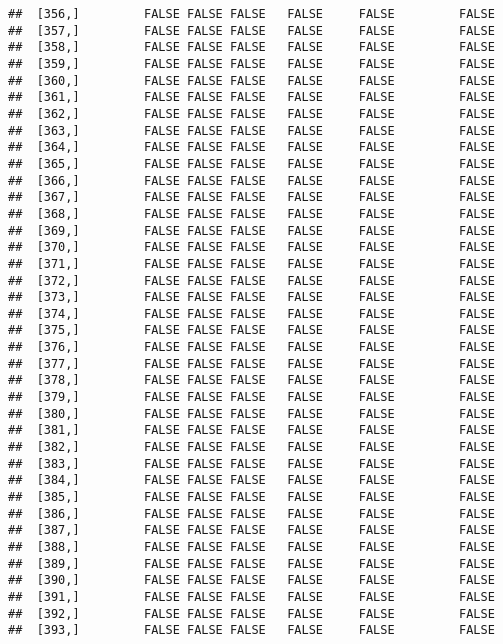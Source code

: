 \documentclass[
]{article}
\begin{document}
\begin{verbatim}
##  [356,]         FALSE FALSE FALSE   FALSE     FALSE         FALSE
##  [357,]         FALSE FALSE FALSE   FALSE     FALSE         FALSE
##  [358,]         FALSE FALSE FALSE   FALSE     FALSE         FALSE
##  [359,]         FALSE FALSE FALSE   FALSE     FALSE         FALSE
##  [360,]         FALSE FALSE FALSE   FALSE     FALSE         FALSE
##  [361,]         FALSE FALSE FALSE   FALSE     FALSE         FALSE
##  [362,]         FALSE FALSE FALSE   FALSE     FALSE         FALSE
##  [363,]         FALSE FALSE FALSE   FALSE     FALSE         FALSE
##  [364,]         FALSE FALSE FALSE   FALSE     FALSE         FALSE
##  [365,]         FALSE FALSE FALSE   FALSE     FALSE         FALSE
##  [366,]         FALSE FALSE FALSE   FALSE     FALSE         FALSE
##  [367,]         FALSE FALSE FALSE   FALSE     FALSE         FALSE
##  [368,]         FALSE FALSE FALSE   FALSE     FALSE         FALSE
##  [369,]         FALSE FALSE FALSE   FALSE     FALSE         FALSE
##  [370,]         FALSE FALSE FALSE   FALSE     FALSE         FALSE
##  [371,]         FALSE FALSE FALSE   FALSE     FALSE         FALSE
##  [372,]         FALSE FALSE FALSE   FALSE     FALSE         FALSE
##  [373,]         FALSE FALSE FALSE   FALSE     FALSE         FALSE
##  [374,]         FALSE FALSE FALSE   FALSE     FALSE         FALSE
##  [375,]         FALSE FALSE FALSE   FALSE     FALSE         FALSE
##  [376,]         FALSE FALSE FALSE   FALSE     FALSE         FALSE
##  [377,]         FALSE FALSE FALSE   FALSE     FALSE         FALSE
##  [378,]         FALSE FALSE FALSE   FALSE     FALSE         FALSE
##  [379,]         FALSE FALSE FALSE   FALSE     FALSE         FALSE
##  [380,]         FALSE FALSE FALSE   FALSE     FALSE         FALSE
##  [381,]         FALSE FALSE FALSE   FALSE     FALSE         FALSE
##  [382,]         FALSE FALSE FALSE   FALSE     FALSE         FALSE
##  [383,]         FALSE FALSE FALSE   FALSE     FALSE         FALSE
##  [384,]         FALSE FALSE FALSE   FALSE     FALSE         FALSE
##  [385,]         FALSE FALSE FALSE   FALSE     FALSE         FALSE
##  [386,]         FALSE FALSE FALSE   FALSE     FALSE         FALSE
##  [387,]         FALSE FALSE FALSE   FALSE     FALSE         FALSE
##  [388,]         FALSE FALSE FALSE   FALSE     FALSE         FALSE
##  [389,]         FALSE FALSE FALSE   FALSE     FALSE         FALSE
##  [390,]         FALSE FALSE FALSE   FALSE     FALSE         FALSE
##  [391,]         FALSE FALSE FALSE   FALSE     FALSE         FALSE
##  [392,]         FALSE FALSE FALSE   FALSE     FALSE         FALSE
##  [393,]         FALSE FALSE FALSE   FALSE     FALSE         FALSE

\end{verbatim}
\end{document}
